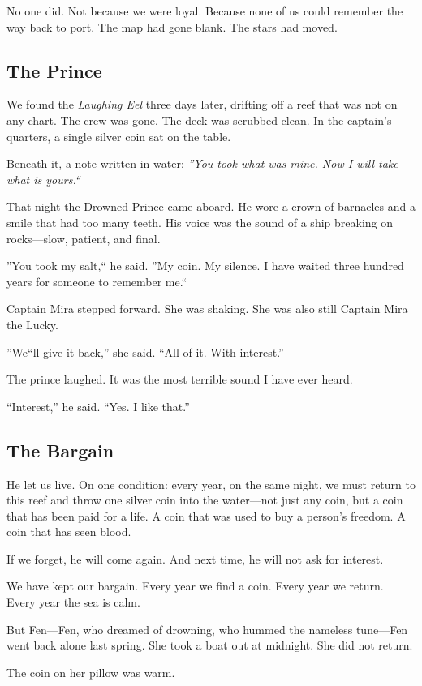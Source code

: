 \documentclass[12pt]{article}
\begin{document}
No one did. Not because we were loyal. Because none of us could remember the way back to port. The map had gone blank. The stars had moved.

\subsection*{The Prince}
We found the \textit{Laughing Eel} three days later, drifting off a reef that was not on any chart. The crew was gone. The deck was scrubbed clean. In the captain's quarters, a single silver coin sat on the table.

Beneath it, a note written in water: \textit{''You took what was mine. Now I will take what is yours.``}

That night the Drowned Prince came aboard. He wore a crown of barnacles and a smile that had too many teeth. His voice was the sound of a ship breaking on rocks---slow, patient, and final.

''You took my salt,`` he said. ''My coin. My silence. I have waited three hundred years for someone to remember me.``

Captain Mira stepped forward. She was shaking. She was also still Captain Mira the Lucky.

''We``ll give it back,'' she said. ``All of it. With interest.''

The prince laughed. It was the most terrible sound I have ever heard.

``Interest,'' he said. ``Yes. I like that.''

\subsection*{The Bargain}
He let us live. On one condition: every year, on the same night, we must return to this reef and throw one silver coin into the water---not just any coin, but a coin that has been paid for a life. A coin that was used to buy a person's freedom. A coin that has seen blood.

If we forget, he will come again. And next time, he will not ask for interest.

We have kept our bargain. Every year we find a coin. Every year we return. Every year the sea is calm.

But Fen---Fen, who dreamed of drowning, who hummed the nameless tune---Fen went back alone last spring. She took a boat out at midnight. She did not return.

The coin on her pillow was warm.
\end{document}
